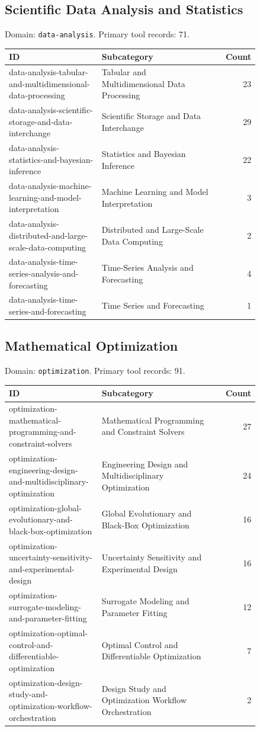 \subsection{Scientific Data Analysis and Statistics}
\noindent Domain: \texttt{data-analysis}. Primary tool records: 71.
\begin{longtable}{p{0.37\linewidth}p{0.47\linewidth}r}
ID & Subcategory & Count\\\hline\endhead
data-analysis-tabular-and-multidimensional-data-processing & Tabular and Multidimensional Data Processing & 23\\
data-analysis-scientific-storage-and-data-interchange & Scientific Storage and Data Interchange & 29\\
data-analysis-statistics-and-bayesian-inference & Statistics and Bayesian Inference & 22\\
data-analysis-machine-learning-and-model-interpretation & Machine Learning and Model Interpretation & 3\\
data-analysis-distributed-and-large-scale-data-computing & Distributed and Large-Scale Data Computing & 2\\
data-analysis-time-series-analysis-and-forecasting & Time-Series Analysis and Forecasting & 4\\
data-analysis-time-series-and-forecasting & Time Series and Forecasting & 1\\
\end{longtable}
\subsection{Mathematical Optimization}
\noindent Domain: \texttt{optimization}. Primary tool records: 91.
\begin{longtable}{p{0.37\linewidth}p{0.47\linewidth}r}
ID & Subcategory & Count\\\hline\endhead
optimization-mathematical-programming-and-constraint-solvers & Mathematical Programming and Constraint Solvers & 27\\
optimization-engineering-design-and-multidisciplinary-optimization & Engineering Design and Multidisciplinary Optimization & 24\\
optimization-global-evolutionary-and-black-box-optimization & Global Evolutionary and Black-Box Optimization & 16\\
optimization-uncertainty-sensitivity-and-experimental-design & Uncertainty Sensitivity and Experimental Design & 16\\
optimization-surrogate-modeling-and-parameter-fitting & Surrogate Modeling and Parameter Fitting & 12\\
optimization-optimal-control-and-differentiable-optimization & Optimal Control and Differentiable Optimization & 7\\
optimization-design-study-and-optimization-workflow-orchestration & Design Study and Optimization Workflow Orchestration & 2\\
\end{longtable}
